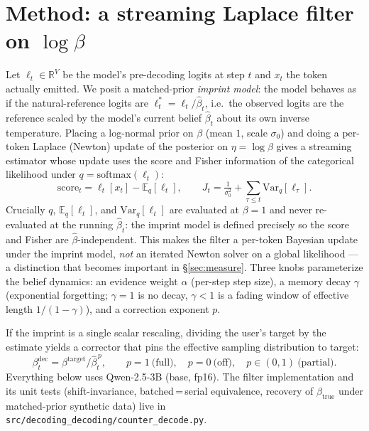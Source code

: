\documentclass[11pt]{article}
\begin{document}
\section{Method: a streaming Laplace filter on $\log\beta$}\label{sec:method}
Let $\ell_t \in \mathbb{R}^V$ be the model's pre-decoding logits at step $t$ and
$x_t$ the token actually emitted. We posit a matched-prior \emph{imprint model}:
the model behaves as if the natural-reference logits are $\ell^*_t = \ell_t /
\hat\beta_t$, i.e.\ the observed logits are the reference scaled by the model's
current belief $\hat\beta_t$ about its own inverse temperature. Placing a
log-normal prior on $\beta$ (mean $1$, scale $\sigma_0$) and doing a per-token
Laplace (Newton) update of the posterior on $\eta=\log\beta$ gives a streaming
estimator whose update uses the score and Fisher information of the categorical
likelihood under $q=\mathrm{softmax}(\ell_t)$:
\[
  \text{score}_t = \ell_t[x_t] - \mathbb{E}_q[\ell_t],
  \qquad
  J_t = \tfrac{1}{\sigma_0^2} + \textstyle\sum_{\tau\le t}\mathrm{Var}_q[\ell_\tau].
\]
Crucially $q$, $\mathbb{E}_q[\ell_t]$, and $\mathrm{Var}_q[\ell_t]$ are
evaluated at $\beta=1$ and never re-evaluated at the running $\hat\beta_t$: the
imprint model is defined precisely so the score and Fisher are
$\hat\beta$-independent. This makes the filter a per-token Bayesian update under
the imprint model, \emph{not} an iterated Newton solver on a global likelihood
--- a distinction that becomes important in \S\ref{sec:measure}. Three knobs
parameterize the belief dynamics: an evidence weight $\alpha$ (per-step step
size), a memory decay $\gamma$ (exponential forgetting; $\gamma=1$ is no decay,
$\gamma<1$ is a fading window of effective length $1/(1-\gamma)$), and a
correction exponent $p$.

If the imprint is a single scalar rescaling, dividing the user's target by the
estimate yields a corrector that pins the effective sampling distribution to
target:
\[
  \beta^{\mathrm{dec}}_t = \beta^{\mathrm{target}} / \hat\beta_t^{\,p},
  \qquad p=1\ \text{(full)},\quad p=0\ \text{(off)},\quad p\in(0,1)\ \text{(partial)}.
\]
Everything below uses Qwen-2.5-3B (base, fp16). The filter implementation and
its unit tests (shift-invariance, batched\,=\,serial equivalence, recovery of
$\beta_{\mathrm{true}}$ under matched-prior synthetic data) live in
\texttt{src/decoding\_decoding/counter\_decode.py}.
\end{document}
